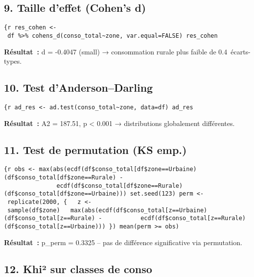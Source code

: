 \documentclass[
]{article}
\begin{document}
\subsection{9. Taille d'effet (Cohen's d)}\label{taille-deffet-cohens-d}

\texttt{\{r\ res\_cohen\ \textless{}-\ df\ \%\textgreater{}\%\ cohens\_d(conso\_total\textasciitilde{}zone,\ var.equal=FALSE)\ res\_cohen}

\textbf{Résultat~:} d = -0.4047 (small) → consommation rurale plus
faible de 0.4~écarts-types.

\subsection{10. Test d'Anderson--Darling}\label{test-dandersondarling}

\texttt{\{r\ ad\_res\ \textless{}-\ ad.test(conso\_total\textasciitilde{}zone,\ data=df)\ ad\_res}

\textbf{Résultat~:} A2 = 187.51, p \textless{} 0.001 → distributions
globalement différentes.

\subsection{11. Test de permutation (KS
emp.)}\label{test-de-permutation-ks-emp.}

\texttt{\{r\ obs\ \textless{}-\ max(abs(ecdf(df\$conso\_total{[}df\$zone==\textquotesingle{}Urbaine\textquotesingle{}{]})(df\$conso\_total{[}df\$zone==\textquotesingle{}Rurale\textquotesingle{}{]})\ -\ \ \ \ \ \ \ \ \ \ \ \ \ \ \ ecdf(df\$conso\_total{[}df\$zone==\textquotesingle{}Rurale\textquotesingle{}{]})(df\$conso\_total{[}df\$zone==\textquotesingle{}Urbaine\textquotesingle{}{]})))\ set.seed(123)\ perm\ \textless{}-\ replicate(2000,\ \{\ \ \ z\ \textless{}-\ sample(df\$zone)\ \ \ max(abs(ecdf(df\$conso\_total{[}z==\textquotesingle{}Urbaine\textquotesingle{}{]})(df\$conso\_total{[}z==\textquotesingle{}Rurale\textquotesingle{}{]})\ -\ \ \ \ \ \ \ \ \ \ \ ecdf(df\$conso\_total{[}z==\textquotesingle{}Rurale\textquotesingle{}{]})(df\$conso\_total{[}z==\textquotesingle{}Urbaine\textquotesingle{}{]})))\ \})\ mean(perm\ \textgreater{}=\ obs)}

\textbf{Résultat~:} p\_perm = 0.3325 -- pas de différence significative
via permutation.

\subsection{12. Khi² sur classes de
conso}\label{khiuxb2-sur-classes-de-conso}
\end{document}
